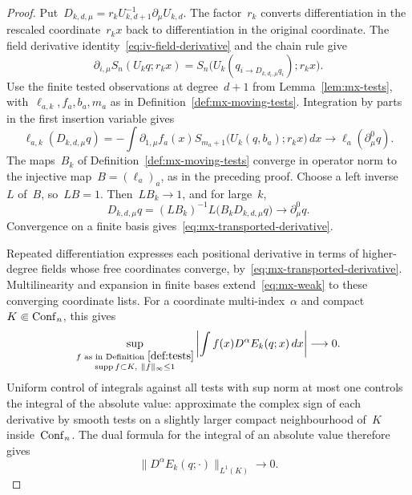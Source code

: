\begin{proof}
Put~$D_{k,d,\mu}=r_kU_{k,d+1}^{-1}\partial_\mu U_{k,d}$. The factor~$r_k$ converts differentiation in the rescaled coordinate~$r_kx$ back to differentiation in the original coordinate.
The field derivative identity~\eqref{eq:iv-field-derivative} and the chain rule give
\begin{equation*}
 \partial_{i,\mu}S_n(U_kq;r_kx)
 =S_n\bigl(U_k(q_{i\to D_{k,d_i,\mu}q_i});r_kx\bigr).
\end{equation*}
Use the finite tested observations at degree~$d+1$ from Lemma~\ref{lem:mx-tests}, with~$\ell_{a,k},f_a,b_a,m_a$ as in Definition~\ref{def:mx-moving-tests}.
Integration by parts in the first insertion variable gives
\begin{equation}\label{eq:mx-tested-derivative}
 \ell_{a,k}(D_{k,d,\mu}q)
 =-\int\partial_{1,\mu}f_a(x)S_{m_a+1}\bigl(U_k(q,b_a);r_kx\bigr)\,dx
 \longrightarrow\ell_a(\partial_\mu^0q).
\end{equation}
The maps~$B_k$ of Definition~\ref{def:mx-moving-tests} converge in operator norm to the injective map~$B=(\ell_a)_a$, as in the preceding proof.
Choose a left inverse~$L$ of~$B$, so~$LB=1$.
Then~$LB_k\to1$, and for large~$k$,
\begin{equation*}
 D_{k,d,\mu}q=(LB_k)^{-1}L\bigl(B_kD_{k,d,\mu}q\bigr)
 \longrightarrow\partial_\mu^0q.
\end{equation*}
Convergence on a finite basis gives~\eqref{eq:mx-transported-derivative}.

Repeated differentiation expresses each positional derivative in terms of higher-degree fields whose free coordinates converge, by~\eqref{eq:mx-transported-derivative}.
Multilinearity and expansion in finite bases extend~\eqref{eq:mx-weak} to these converging coordinate lists.
For a coordinate multi-index~$\alpha$ and compact~$K\Subset\operatorname{Conf}_{n}$, this gives
\begin{equation*}
 \sup_{\substack{f\text{ as in Definition }\ref{def:tests}\\\operatorname{supp} f\subset K,\ \|f\|_\infty\le1}}
 \left|\int f(x)D^\alpha E_k(q;x)\,dx\right|\longrightarrow0.
\end{equation*}
Uniform control of integrals against all tests with sup norm at most one controls the integral of the absolute value: approximate the complex sign of each derivative by smooth tests on a slightly larger compact neighbourhood of~$K$ inside~$\operatorname{Conf}_{n}$. The dual formula for the integral of an absolute value therefore gives
\begin{equation*}
 \|D^\alpha E_k(q;\cdot)\|_{L^1(K)}\longrightarrow0.
\end{equation*}


\end{proof}
